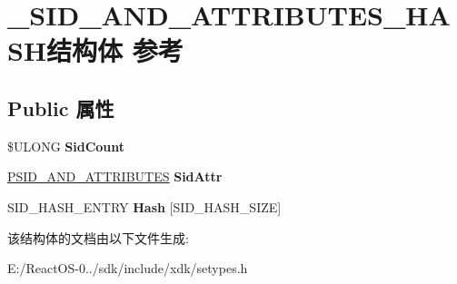 \hypertarget{struct___s_i_d___a_n_d___a_t_t_r_i_b_u_t_e_s___h_a_s_h}{}\section{\+\_\+\+S\+I\+D\+\_\+\+A\+N\+D\+\_\+\+A\+T\+T\+R\+I\+B\+U\+T\+E\+S\+\_\+\+H\+A\+S\+H结构体 参考}
\label{struct___s_i_d___a_n_d___a_t_t_r_i_b_u_t_e_s___h_a_s_h}
\subsection*{Public 属性}
\begin{DoxyCompactItemize}
\item 
\mbox{\label{struct___s_i_d___a_n_d___a_t_t_r_i_b_u_t_e_s___h_a_s_h_a6df5a66a94a25561ce15060445cba72d}} 
\$U\+L\+O\+NG {\bfseries Sid\+Count}
\item 
\mbox{\label{struct___s_i_d___a_n_d___a_t_t_r_i_b_u_t_e_s___h_a_s_h_a7270e2fecf5dede086af7deb0203d61c}} 
\hyperlink{struct___s_i_d___a_n_d___a_t_t_r_i_b_u_t_e_s}{P\+S\+I\+D\+\_\+\+A\+N\+D\+\_\+\+A\+T\+T\+R\+I\+B\+U\+T\+ES} {\bfseries Sid\+Attr}
\item 
\mbox{\label{struct___s_i_d___a_n_d___a_t_t_r_i_b_u_t_e_s___h_a_s_h_aa4d0617446cb0fd653b11ccee30aa9f4}} 
S\+I\+D\+\_\+\+H\+A\+S\+H\+\_\+\+E\+N\+T\+RY {\bfseries Hash} \mbox{[}S\+I\+D\+\_\+\+H\+A\+S\+H\+\_\+\+S\+I\+ZE\mbox{]}
\end{DoxyCompactItemize}


该结构体的文档由以下文件生成\+:\begin{DoxyCompactItemize}
\item 
E\+:/\+React\+O\+S-\/0../sdk/include/xdk/setypes.\+h\end{DoxyCompactItemize}
